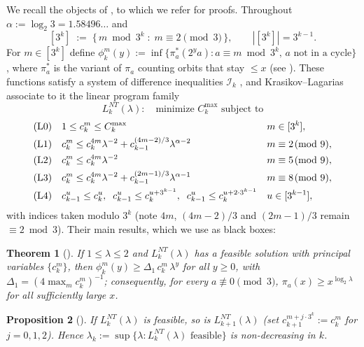 \documentclass[11pt]{article}
\newtheorem{theorem}{Theorem}[section]
\newtheorem{proposition}[theorem]{Proposition}
\newcommand{\classes}[1]{[3^{#1}]}
\begin{document}
We recall the objects of \cite{kl}, to which we refer for proofs.
Throughout $\alpha := \log_2 3 = 1.58496\ldots$ and
\[
\classes{k} \;:=\; \{\, m \bmod 3^k \;:\; m \equiv 2 \!\!\pmod 3 \,\},
\qquad |\classes{k}| = 3^{k-1}.
\]
For $m \in \classes{k}$ define
$\phi_k^m(y) := \inf\{ \pi^*_a(2^y a) : a \equiv m \bmod 3^k,\,
a \text{ not in a cycle}\}$, where $\pi^*_a$ is the variant of
$\pi_a$ counting orbits that stay $\le x$ (see \cite[\S2]{kl}). These
functions satisfy a system of difference inequalities
$\mathcal{I}_k$ \cite[Prop.~2.1]{kl}, and Krasikov--Lagarias associate
to it the linear program family
\[
L_k^{NT}(\lambda):\quad \text{minimize } C_k^{\max} \text{ subject to}
\]
\begin{align}
&\text{(L0)}\quad 1 \le c_k^m \le C_k^{\max}
&& m \in \classes{k}, \notag\\
&\text{(L1)}\quad c_k^m \le c_k^{4m} \lambda^{-2}
   + c_{k-1}^{(4m-2)/3} \lambda^{\alpha - 2}
&& m \equiv 2 \!\!\pmod 9, \notag\\
&\text{(L2)}\quad c_k^m \le c_k^{4m} \lambda^{-2}
&& m \equiv 5 \!\!\pmod 9, \notag\\
&\text{(L3)}\quad c_k^m \le c_k^{4m} \lambda^{-2}
   + c_{k-1}^{(2m-1)/3} \lambda^{\alpha - 1}
&& m \equiv 8 \!\!\pmod 9, \notag\\
&\text{(L4)}\quad c_{k-1}^{u} \le c_k^{u},\;\;
   c_{k-1}^{u} \le c_k^{u + 3^{k-1}},\;\;
   c_{k-1}^{u} \le c_k^{u + 2\cdot 3^{k-1}}
&& u \in \classes{k-1}, \notag
\end{align}
with indices taken modulo $3^k$ (note $4m$, $(4m-2)/3$ and $(2m-1)/3$
remain $\equiv 2 \bmod 3$). Their main results, which we use as black
boxes:

\begin{theorem}[{\cite[Thm.~2.2 and \S6]{kl}}]\label{thm:kl}
If $1 \le \lambda \le 2$ and $L_k^{NT}(\lambda)$ has a feasible
solution with principal variables $\{c_k^m\}$, then
$\phi_k^m(y) \ge \Delta_1\, c_k^m\, \lambda^y$ for all $y \ge 0$, with
$\Delta_1 = (4 \max_m c_k^m)^{-1}$; consequently, for every
$a \not\equiv 0 \pmod 3$,
$\pi_a(x) \ge x^{\log_2 \lambda}$ for all sufficiently large $x$.
\end{theorem}

\begin{proposition}[{\cite[\S6]{kl}}]\label{prop:lift}
If $L_k^{NT}(\lambda)$ is feasible, so is $L_{k+1}^{NT}(\lambda)$
(set $c_{k+1}^{m + j\cdot 3^k} := c_k^m$ for $j = 0, 1, 2$). Hence
$\lambda_k := \sup\{\lambda : L_k^{NT}(\lambda) \text{ feasible}\}$ is
non-decreasing in $k$.
\end{proposition}
\end{document}

